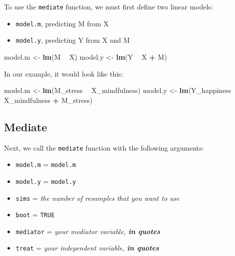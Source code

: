 \documentclass[]{book}
\newenvironment{Shaded}{\begin{snugshade}}{\end{snugshade}}
\newcommand{\KeywordTok}[1]{\textcolor[rgb]{0.13,0.29,0.53}{\textbf{#1}}}
\newcommand{\NormalTok}[1]{#1}
\newcommand{\OperatorTok}[1]{\textcolor[rgb]{0.81,0.36,0.00}{\textbf{#1}}}
\newcommand{\StringTok}[1]{\textcolor[rgb]{0.31,0.60,0.02}{#1}}
\begin{document}
To use the \texttt{mediate} function, we must first define two linear models:

\begin{itemize}
\item
  \texttt{model.m}, predicting M from X
\item
  \texttt{model.y}, predicting Y from X and M
\end{itemize}

\begin{Shaded}
\begin{Highlighting}[]
\NormalTok{model.m <-}\StringTok{ }\KeywordTok{lm}\NormalTok{(M }\OperatorTok{~}\StringTok{ }\NormalTok{X)}
\NormalTok{model.y <-}\StringTok{ }\KeywordTok{lm}\NormalTok{(Y }\OperatorTok{~}\StringTok{ }\NormalTok{X }\OperatorTok{+}\StringTok{ }\NormalTok{M)}
\end{Highlighting}
\end{Shaded}

In our example, it would look like this:

\begin{Shaded}
\begin{Highlighting}[]
\NormalTok{model.m <-}\StringTok{ }\KeywordTok{lm}\NormalTok{(M_stress }\OperatorTok{~}\StringTok{ }\NormalTok{X_mindfulness)}
\NormalTok{model.y <-}\StringTok{ }\KeywordTok{lm}\NormalTok{(Y_happiness }\OperatorTok{~}\StringTok{ }\NormalTok{X_mindfulness }\OperatorTok{+}\StringTok{ }\NormalTok{M_stress)}
\end{Highlighting}
\end{Shaded}

\hypertarget{mediate}{%
\subsection{Mediate}\label{mediate}}

Next, we call the \texttt{mediate} function with the following arguments:

\begin{itemize}
\item
  \texttt{model.m} = \texttt{model.m}
\item
  \texttt{model.y} = \texttt{model.y}
\item
  \texttt{sims} = \emph{the number of resamples that you want to use}
\item
  \texttt{boot} = \texttt{TRUE}
\item
  \texttt{mediator} = \emph{your mediator variable, \textbf{in quotes} }
\item
  \texttt{treat} = \emph{your independent variable, \textbf{in quotes} }
\end{itemize}
\end{document}
